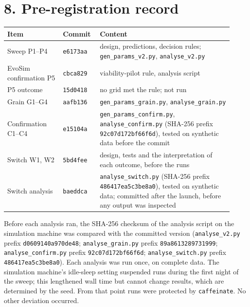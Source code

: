 \section*{8. Pre-registration record}
\begin{center}
\small
\begin{tabular}{@{}p{0.23\linewidth}p{0.14\linewidth}p{0.55\linewidth}@{}}
\toprule
Item & Commit & Content\\
\midrule
Sweep P1--P4 & \texttt{e6173aa} & design, predictions, decision rules; \texttt{gen\_params\_v2.py}, \texttt{analyse\_v2.py}\\
EvoSim confirmation P5 & \texttt{cbca829} & viability-pilot rule, analysis script\\
P5 outcome & \texttt{15d0418} & no grid met the rule; not run\\
Grain G1--G4 & \texttt{aafb136} & \texttt{gen\_params\_grain.py}, \texttt{analyse\_grain.py}\\
Confirmation C1--C4 & \texttt{e15104a} & \texttt{gen\_params\_confirm.py}, \texttt{analyse\_confirm.py} (SHA-256 prefix \texttt{92c07d172bf66f6d}), tested on synthetic data before the commit\\
Switch W1, W2 & \texttt{5bd4fee} & design, tests and the interpretation of each outcome, before the runs\\
Switch analysis & \texttt{baeddca} & \texttt{analyse\_switch.py} (SHA-256 prefix \texttt{486417ea5c3be8a0}), tested on synthetic data; committed after the launch, before any output was inspected\\
\bottomrule
\end{tabular}
\end{center}
Before each analysis ran, the SHA-256 checksum of the analysis script on the
simulation machine was compared with the committed version (\texttt{analyse\_v2.py}
prefix \texttt{d0609140a970de48}; \texttt{analyse\_grain.py} prefix
\texttt{89a8613289731999}; \texttt{analyse\_confirm.py} prefix
\texttt{92c07d172bf66f6d}; \texttt{analyse\_switch.py} prefix
\texttt{486417ea5c3be8a0}). Each analysis was run once, on complete data. The
simulation machine's idle-sleep setting suspended runs during the first night of
the sweep; this lengthened wall time but cannot change results, which are
determined by the seed. From that point runs were protected by
\texttt{caffeinate}. No other deviation occurred.

